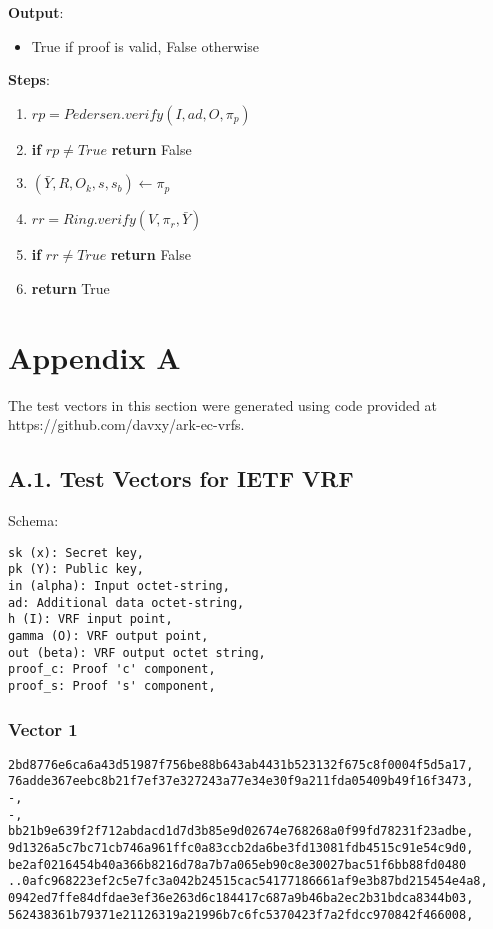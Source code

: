 \documentclass[
]{article}
\providecommand{\tightlist}{%
  \setlength{\itemsep}{0pt}\setlength{\parskip}{0pt}}
\begin{document}
\textbf{Output}:

\begin{itemize}
\tightlist
\item
  True if proof is valid, False otherwise
\end{itemize}

\textbf{Steps}:

\begin{enumerate}
\def\labelenumi{\arabic{enumi}.}
\tightlist
\item
  \(rp = Pedersen.verify(I, ad, O, \pi_p)\)
\item
  \textbf{if} \(rp \neq True\) \textbf{return} False
\item
  \((\bar{Y}, R, O_k, s, s_b) \leftarrow \pi_p\)
\item
  \(rr = Ring.verify(V, \pi_r, \bar{Y})\)
\item
  \textbf{if} \(rr \neq True\) \textbf{return} False
\item
  \textbf{return} True
\end{enumerate}

\hypertarget{appendix-a}{%
\section{Appendix A}\label{appendix-a}}

The test vectors in this section were generated using code provided at
https://github.com/davxy/ark-ec-vrfs.

\hypertarget{a.1.-test-vectors-for-ietf-vrf}{%
\subsection{A.1. Test Vectors for IETF
VRF}\label{a.1.-test-vectors-for-ietf-vrf}}

Schema:

\begin{verbatim}
sk (x): Secret key,
pk (Y): Public key,
in (alpha): Input octet-string,
ad: Additional data octet-string,
h (I): VRF input point,
gamma (O): VRF output point,
out (beta): VRF output octet string,
proof_c: Proof 'c' component,
proof_s: Proof 's' component,
\end{verbatim}

\hypertarget{vector-1}{%
\subsubsection{Vector 1}\label{vector-1}}

\begin{verbatim}
2bd8776e6ca6a43d51987f756be88b643ab4431b523132f675c8f0004f5d5a17,
76adde367eebc8b21f7ef37e327243a77e34e30f9a211fda05409b49f16f3473,
-,
-,
bb21b9e639f2f712abdacd1d7d3b85e9d02674e768268a0f99fd78231f23adbe,
9d1326a5c7bc71cb746a961ffc0a83ccb2da6be3fd13081fdb4515c91e54c9d0,
be2af0216454b40a366b8216d78a7b7a065eb90c8e30027bac51f6bb88fd0480
..0afc968223ef2c5e7fc3a042b24515cac54177186661af9e3b87bd215454e4a8,
0942ed7ffe84dfdae3ef36e263d6c184417c687a9b46ba2ec2b31bdca8344b03,
562438361b79371e21126319a21996b7c6fc5370423f7a2fdcc970842f466008,
\end{verbatim}
\end{document}
